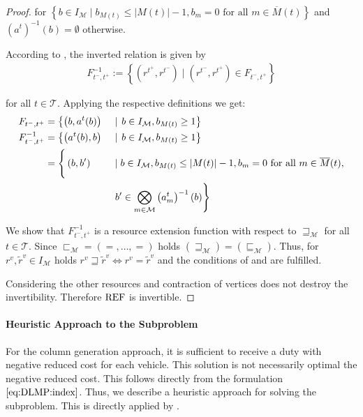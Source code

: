 \begin{proof}
for $\left\{b\in I_{\mathcal{M}}\mid b_{M(t)}\leq\vert M(t)\vert - 1, b_m=0 \text{ for all } m\in\overline{M}(t)\right\}$ and $\left(a^t\right)^{-1}(b) = \emptyset$ otherwise.

According to , the inverted relation is given by
\begin{align*}
	F^{-1}_{t^-,t^+} := \left\{\left(r^{t^+},r^{t^-}\right)\mid \left(r^{t^-},r^{t^+}\right)\in F_{t^-,t^+}\right\}
\end{align*}

for all $t\in\mathcal{T}$. Applying the respective definitions we get:
\begin{align*}
	F_{t^-,t^+} & = \left\{\left(b, a^t(b)\right)\right. && \mid \left. b\in I_{\mathcal{M}}, b_{M(t)}\geq 1\right\} \\
	F^{-1}_{t^-,t^+} & = \left\{\left(a^t(b), b\right)\right. && \mid \left. b\in I_{\mathcal{M}}, b_{M(t)}\geq 1\right\} \\
	& = \left\{\vphantom{\bigotimes_{m\in\mathcal{M}}}\left(b, b'\right)\right. && \mid b\in I_{\mathcal{M}}, b_{M(t)}\leq\vert M(t)\vert-1, b_m=0 \text{ for all } m\in\overline{M}(t), \\
	&&& \left. b'\in\bigotimes_{m\in\mathcal{M}}\left(a^t_m\right)^{-1}(b)\right\}
\end{align*}

We show that $F^{-1}_{t^-,t^+}$ is a resource extension function with respect to $\sqsupseteq_{\mathcal{M}}$ for all $t\in\mathcal{T}$. Since ${\sqsubset_{\mathcal{M}} = \left(=,\dots,=\right)}$ holds ${\left(\sqsupseteq_{\mathcal{M}}\right) = \left(\sqsubseteq_{\mathcal{M}}\right)}$. Thus, for ${r^v,\tilde{r}^v\in I_{\mathcal{M}}}$ holds ${r^v\sqsupseteq\tilde{r}^v\Leftrightarrow r^v = \tilde{r}^v}$ and the conditions of  and  are fulfilled.

Considering the other resources and contraction of vertices does not destroy the invertibility. Therefore $\operatorname{REF}$ is invertible.

\end{proof}

\paragraph{Heuristic Approach to the Subproblem} \parfill

For the column generation approach, it is sufficient to receive a duty with negative reduced cost for each vehicle. This solution is not necessarily optimal \wrt the negative reduced cost. This follows directly from the formulation $\eqref{eq:DLMP:index}$. Thus, we describe a heuristic approach for solving the subproblem. This is directly applied by \cite[pp.~104-107]{Kaiser}.

